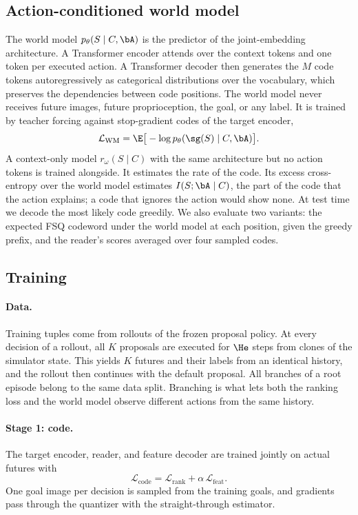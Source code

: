 \subsection{Action-conditioned world model}
\label{sec:wm}
The world model $p_\theta(S\mid C,\bA)$ is the predictor of the joint-embedding architecture.
A Transformer encoder attends over the context tokens and one token per executed action.
A Transformer decoder then generates the $M$ code tokens autoregressively as categorical distributions over the vocabulary, which preserves the dependencies between code positions.
The world model never receives future images, future proprioception, the goal, or any label.
It is trained by teacher forcing against stop-gradient codes of the target encoder,
\begin{equation}
  \mathcal{L}_{\mathrm{WM}}=\E\big[-\log p_\theta(\sg(S)\mid C,\bA)\big].
  \label{eq:wm}
\end{equation}
A context-only model $r_\omega(S\mid C)$ with the same architecture but no action tokens is trained alongside.
It estimates the rate of the code.
Its excess cross-entropy over the world model estimates $I(S;\bA\mid C)$, the part of the code that the action explains; a code that ignores the action would show none.
At test time we decode the most likely code greedily.
We also evaluate two variants: the expected FSQ codeword under the world model at each position, given the greedy prefix, and the reader's scores averaged over four sampled codes.

\subsection{Training}
\label{sec:codesign}
\paragraph{Data.}
Training tuples come from rollouts of the frozen proposal policy.
At every decision of a rollout, all $K$ proposals are executed for $\He$ steps from clones of the simulator state.
This yields $K$ futures and their labels from an identical history, and the rollout then continues with the default proposal.
All branches of a root episode belong to the same data split.
Branching is what lets both the ranking loss and the world model observe different actions from the same history.

\paragraph{Stage 1: code.}
The target encoder, reader, and feature decoder are trained jointly on actual futures with
\begin{equation}
  \mathcal{L}_{\mathrm{code}}=\mathcal{L}_{\mathrm{rank}}+\alpha\,\mathcal{L}_{\mathrm{feat}}.
  \label{eq:code}
\end{equation}
One goal image per decision is sampled from the training goals, and gradients pass through the quantizer with the straight-through estimator.


